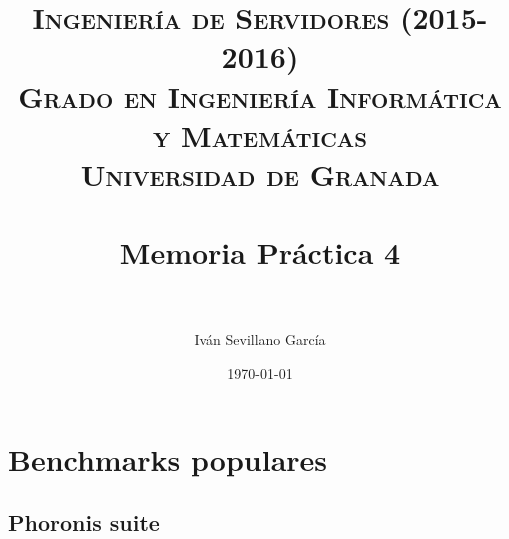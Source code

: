 

\title{	
	\normalfont \normalsize 
	\textsc{{\bf Ingeniería de Servidores (2015-2016)} \\ Grado en Ingeniería Informática y Matemáticas \\ Universidad de Granada} \\ [25pt] %
	\horrule{0.5pt} \\[0.4cm] %
	\huge Memoria Práctica 4 \\ %
	\horrule{2pt} \\[0.5cm] %
}

\author{Iván Sevillano García} %

\date{\normalsize\today} %



\maketitle %

\newpage %

\tableofcontents %

\newpage

\section{Benchmarks populares}

\subsection{Phoronis suite}

